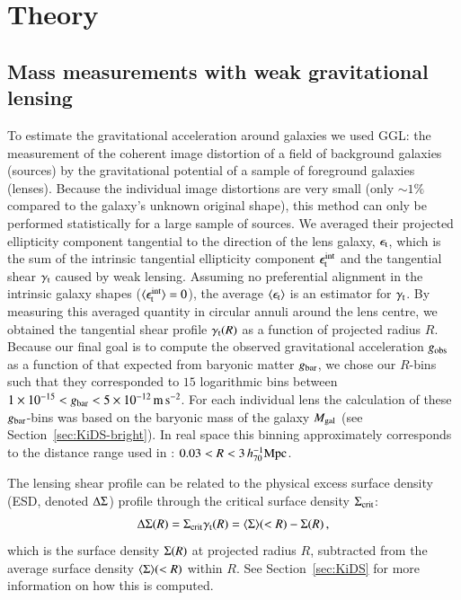 \documentclass{aa}
\newcommand{\hMpc}{\,h_{70}^{-1}{\rm{Mpc}} }
\newcommand{\mpss}{\,{\rm m}\,{\rm s}^{-2} }
\renewcommand{\Upsigma}{{\rm \Sigma}}
\renewcommand{\Updelta}{{\rm \Delta}}
\newcommand{\lan}{\langle}
\newcommand{\ran}{\rangle}
\newcommand*{\meanb}[1]{\langle{#1}\rangle}
\newcommand*{\E}[1]{\times 10^{#1}}
\newcommand{\un}[1]{_{\rm #1}}
\begin{document}
\section{Theory}
\label{sec:Theory}

\subsection{Mass measurements with weak gravitational lensing}
\label{sec:Lensing}

To estimate the gravitational acceleration around galaxies we used GGL: the measurement of the coherent image distortion of a field of background galaxies (sources) by the gravitational potential of a sample of foreground galaxies (lenses). Because the individual image distortions are very small (only $\sim1\%$ compared to the galaxy's unknown original shape), this method can only be performed statistically for a large sample of sources. We averaged their projected ellipticity component tangential to the direction of the lens galaxy, $\epsilon\un{t}$, which is the sum of the intrinsic tangential ellipticity component $\epsilon\un{t}^{\rm int}$ and the tangential shear $\gamma\un{t}$ caused by weak lensing. Assuming no preferential alignment in the intrinsic galaxy shapes ($\lan\epsilon\un{t}^{\rm int}\ran=0$), the average $\lan\epsilon\un{t}\ran$ is an estimator for $\gamma\un{t}$. By measuring this averaged quantity in circular annuli around the lens centre, we obtained the tangential shear profile $\gamma\un{t}(R)$ as a function of projected radius $R$. Because our final goal is to compute the observed gravitational acceleration $g\un{obs}$ as a function of that expected from baryonic matter $g\un{bar}$, we chose our $R$-bins such that they corresponded to $15$ logarithmic bins between $1\E{-15} < g\un{bar} < 5\E{-12} \mpss$. For each individual lens the calculation of these $g\un{bar}$-bins was based on the baryonic mass of the galaxy $M\un{gal}$ (see Section~\ref{sec:KiDS-bright}). In real space this binning approximately corresponds to the distance range used in \cite{brouwer2017}: $0.03 < R < 3 \hMpc$.

The lensing shear profile can be related to the physical excess surface density (ESD, denoted $\Updelta\Upsigma$) profile through the critical surface density $\Upsigma\un{crit}$:
\begin{equation}
\Updelta \Upsigma (R) = \Upsigma\un{crit} \gamma\un{t}(R) = \meanb{\Upsigma}(<R) - \Upsigma(R) \, ,
\label{eq:deltasigma}
\end{equation}
which is the surface density $\Upsigma(R)$ at projected radius $R$, subtracted from the average surface density $\meanb{\Upsigma}(<R)$ within $R$. See Section~\ref{sec:KiDS} for more information on how this is computed.
\end{document}
